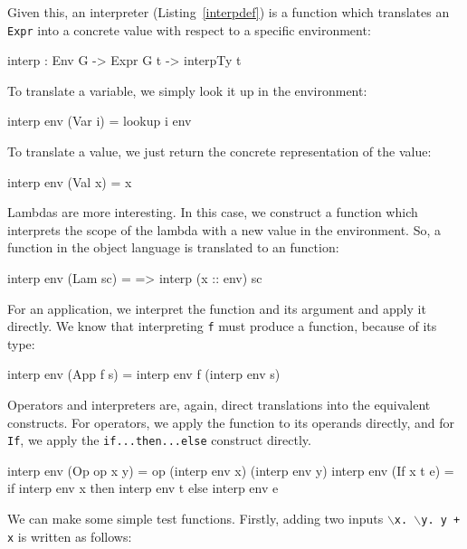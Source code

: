 \noindent
Given this, an interpreter (Listing~\ref{interpdef}) is a function which translates an \texttt{Expr} into a concrete \Idris{} value with respect to a specific environment:

\begin{code}
interp : Env G -> Expr G t -> interpTy t
\end{code}

\noindent
To translate a variable, we simply look it up in the environment:

\begin{code}
interp env (Var i) = lookup i env
\end{code}

\noindent
To translate a value, we just return the concrete representation of the value:

\begin{code}
interp env (Val x) = x
\end{code}

\noindent
Lambdas are more interesting.
In this case, we construct a function which interprets the scope of the lambda with a new value in the environment.
So, a function in the object language is translated to an \Idris{} function:

\begin{code}
interp env (Lam sc) = \x => interp (x :: env) sc
\end{code}

\noindent
For an application, we interpret the function and its argument and apply it directly.
We know that interpreting \texttt{f} must produce a function, because of its type:

\begin{code}
interp env (App f s) = interp env f (interp env s)
\end{code}

\noindent
Operators and interpreters are, again, direct translations into the equivalent \Idris{} constructs.
For operators, we apply the function to its operands directly, and for \texttt{If}, we apply the \Idris{} \texttt{if...then...else} construct directly.

\begin{code}
interp env (Op op x y) = op (interp env x) (interp env y)
interp env (If x t e)  = if interp env x then interp env t 
                                         else interp env e
\end{code}

\noindent
We can make some simple test functions. Firstly, adding two inputs
\texttt{$\backslash$x. $\backslash$y. y + x} is written as follows:

